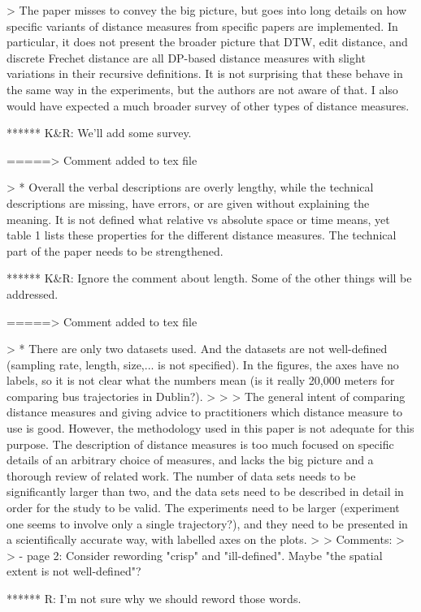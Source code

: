 > The paper misses to convey the big picture, but goes into long details on how specific variants of distance measures from specific papers are implemented. In particular, it does not present the broader picture that DTW, edit distance, and discrete Frechet distance are all DP-based distance measures with slight variations in their recursive definitions. It is not surprising that these behave in the same way in the experiments, but the authors are not aware of that. I also would have expected a much broader survey of other types of distance measures.

****** K&R: We'll add some survey.

=====> Comment added to tex file


> * Overall the verbal descriptions are overly lengthy, while the technical descriptions are missing, have errors, or are given without explaining the meaning. It is not defined what relative vs absolute space or time means, yet table 1 lists these properties for the different distance measures. The technical part of the paper needs to be strengthened.

****** K&R: Ignore the comment about length. Some of the other things will be addressed.

=====> Comment added to tex file


> * There are only two datasets used. And the datasets are not well-defined (sampling rate, length, size,... is not specified). In the figures, the axes have no labels, so it is not clear what the numbers mean (is it really 20,000 meters for comparing bus trajectories in Dublin?).
>
>
> The general intent of comparing distance measures and giving advice to practitioners which distance measure to use is good. However, the methodology used in this paper is not adequate for this purpose. The description of distance measures is too much focused on specific details of an arbitrary choice of measures, and lacks the big picture and a thorough review of related work. The number of data sets needs to be significantly larger than two, and the data sets need to be described in detail in order for the study to be valid. The experiments need to be larger (experiment one seems to involve only a single trajectory?), and they need to be presented in a scientifically accurate way, with labelled axes on the plots.
>
> Comments:
>
> - page 2: Consider rewording "crisp" and "ill-defined". Maybe "the spatial extent is not well-defined"?

******  R: I'm not sure why we should reword those words.

